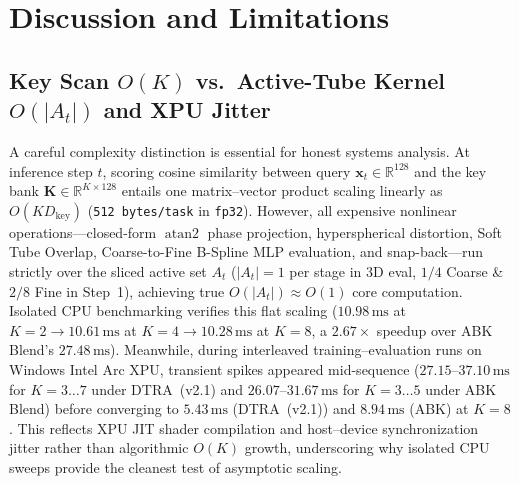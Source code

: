 \documentclass[10pt,twocolumn]{article}
\begin{document}
\section{Discussion and Limitations}

\subsection{Key Scan \texorpdfstring{$O(K)$}{O(K)} vs.\ Active-Tube Kernel \texorpdfstring{$O(|A_t|)$}{O(|At|)} and XPU Jitter}
A careful complexity distinction is essential for honest systems analysis. At inference step $t$, scoring cosine similarity between query $\mathbf{x}_t \in \mathbb{R}^{128}$ and the key bank $\mathbf{K} \in \mathbb{R}^{K \times 128}$ entails one matrix--vector product scaling linearly as $O(K D_{\text{key}})$ (\texttt{512\,bytes/task} in \texttt{fp32}). However, all expensive nonlinear operations---closed-form $\operatorname{atan2}$ phase projection, hyperspherical distortion, Soft Tube Overlap, Coarse-to-Fine B-Spline MLP evaluation, and snap-back---run strictly over the sliced active set $A_t$ ($|A_t|=1$ per stage in 3D eval, $1/4$ Coarse \& $2/8$ Fine in Step~1), achieving true \textbf{$O(|A_t|) \approx O(1)$} core computation. Isolated CPU benchmarking verifies this flat scaling ($10.98\,\text{ms}$ at $K=2 \to 10.61\,\text{ms}$ at $K=4 \to 10.28\,\text{ms}$ at $K=8$, a $2.67\times$ speedup over ABK Blend's $27.48\,\text{ms}$). Meanwhile, during interleaved training--evaluation runs on Windows Intel Arc XPU, transient spikes appeared mid-sequence ($27.15$--$37.10\,\text{ms}$ for $K=3 \dots 7$ under DTRA~(v2.1) and $26.07$--$31.67\,\text{ms}$ for $K=3 \dots 5$ under ABK Blend) before converging to $5.43\,\text{ms}$ (DTRA~(v2.1)) and $8.94\,\text{ms}$ (ABK) at $K=8$. This reflects XPU JIT shader compilation and host--device synchronization jitter rather than algorithmic $O(K)$ growth, underscoring why isolated CPU sweeps provide the cleanest test of asymptotic scaling.
\end{document}

